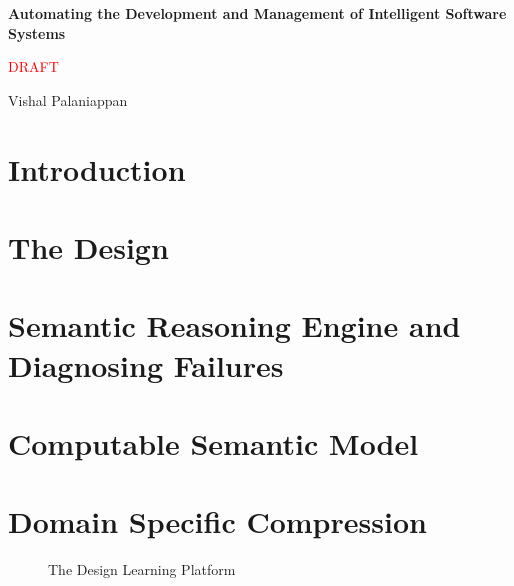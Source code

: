 \documentclass{article}
\begin{document}
\newpage
\begin{titlepage}
    \centering
    \vspace*{\fill}
    {\Huge\bfseries Automating the Development and Management of Intelligent Software Systems\par}

     \vspace{1cm}

    {\Large \textcolor{red}{DRAFT}\par}
    \vspace{6cm}
     {\Large Vishal Palaniappan\par}
    \vspace*{\fill}
\end{titlepage}

\newpage
\tableofcontents

\newpage
\section{Introduction}


\section{The Design}


\newpage
\section{Semantic Reasoning Engine and Diagnosing Failures}


\newpage
\section{Computable Semantic Model}


\newpage
\section{Domain Specific Compression}


\begin{landscape}
    \begin{figure}[htbp]
        \centering
        
        \caption{The Design Learning Platform}
        \label{fig:dlp_diagram}
    \end{figure}
\end{landscape}
\end{document}

